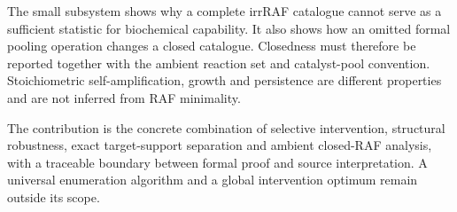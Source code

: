 \documentclass[11pt]{article}
\theoremstyle{definition}\newtheorem{definition}[theorem]{Definition}
\begin{document}
The small subsystem shows why a complete irrRAF catalogue cannot serve as a sufficient statistic for biochemical capability. It also shows how an omitted formal pooling operation changes a closed catalogue. Closedness must therefore be reported together with the ambient reaction set and catalyst-pool convention. Stoichiometric self-amplification, growth and persistence are different properties and are not inferred from RAF minimality.

The contribution is the concrete combination of selective intervention, structural robustness, exact target-support separation and ambient closed-RAF analysis, with a traceable boundary between formal proof and source interpretation. A universal enumeration algorithm and a global intervention optimum remain outside its scope.



\end{document}
